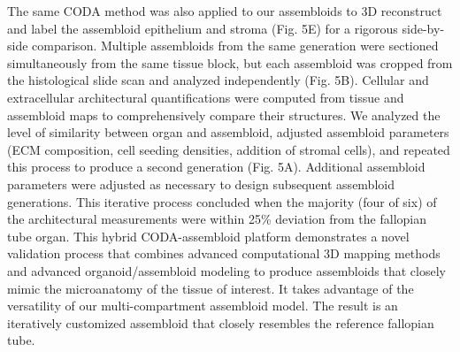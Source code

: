 \begin{refsection}
    The same CODA method was also applied to our assembloids to 3D reconstruct and label the assembloid epithelium and stroma (Fig. 5E) for a rigorous side-by-side comparison.  Multiple assembloids from the same generation were sectioned simultaneously from the same tissue block, but each assembloid was cropped from the histological slide scan and analyzed independently (Fig. 5B). Cellular and extracellular architectural quantifications were computed from tissue and assembloid maps to comprehensively compare their structures. We analyzed the level of similarity between organ and assembloid, adjusted assembloid parameters (ECM composition, cell seeding densities, addition of stromal cells), and repeated this process to produce a second generation (Fig. 5A). Additional assembloid parameters were adjusted as necessary to design subsequent assembloid generations. This iterative process concluded when the majority (four of six) of the architectural measurements were within 25\% deviation from the fallopian tube organ. 
    This hybrid CODA-assembloid platform demonstrates a novel validation process that combines advanced computational 3D mapping methods and advanced organoid/assembloid modeling to produce assembloids that closely mimic the microanatomy of the tissue of interest. It takes advantage of the versatility of our multi-compartment assembloid model. The result is an iteratively customized assembloid that closely resembles the reference fallopian tube. 


\end{refsection}
